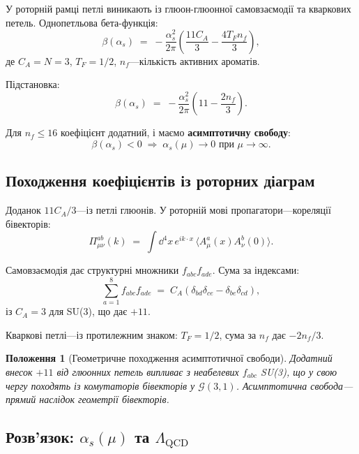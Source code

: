 \documentclass[11pt,a4paper]{article}
\newcommand{\Cl}{\mathcal{G}}
\theoremstyle{definition}
\theoremstyle{plain}
\newtheorem{proposition}{Положення}[section]
\theoremstyle{remark}
\begin{document}
У роторній рамці петлі виникають із глюон-глюонної самовзаємодії та кваркових петель. Однопетльова бета-функція:
\begin{equation}
\beta(\alpha_s) \;=\; -\frac{\alpha_s^2}{2\pi}\left(\frac{11C_A}{3} - \frac{4T_F n_f}{3}\right),
\label{eq:beta-function}
\end{equation}
де $C_A=N=3$, $T_F=1/2$, $n_f$—кількість активних ароматів.

Підстановка:
\begin{equation}
\beta(\alpha_s) \;=\; -\frac{\alpha_s^2}{2\pi}\left(11 - \frac{2n_f}{3}\right).
\label{eq:beta-qcd}
\end{equation}

Для $n_f\le 16$ коефіцієнт додатний, і маємо \textbf{асимптотичну свободу}:
\begin{equation}
\beta(\alpha_s)<0 \;\Rightarrow\; \alpha_s(\mu)\to 0 \text{ при } \mu\to\infty.
\end{equation}

\subsection{Походження коефіцієнтів із роторних діаграм}

Доданок $11C_A/3$—із петлі глюонів. У роторній мові пропагатори—кореляції бівекторів:
\begin{equation}
\Pi_{\mu\nu}^{ab}(k) \;=\; \int \dd^4x \, e^{ik \cdot x}\,\langle A_\mu^a(x) A_\nu^b(0) \rangle.
\end{equation}

Самовзаємодія дає структурні множники $f_{abc}f_{ade}$. Сума за індексами:
\begin{equation}
\sum_{a=1}^8 f_{abc}f_{ade} \;=\; C_A(\delta_{bd}\delta_{ce} - \delta_{be}\delta_{cd}),
\end{equation}
із $C_A=3$ для SU(3), що дає $+11$.

Кваркові петлі—із протилежним знаком: $T_F=1/2$, сума за $n_f$ дає $-2n_f/3$.

\begin{proposition}[Геометричне походження асимптотичної свободи]
Додатний внесок $+11$ від глюонних петель випливає з неабелевих $f_{abc}$ SU(3), що у свою чергу походять із комутаторів бівекторів у $\Cl(3,1)$. Асимптотична свобода—прямий наслідок геометрії бівекторів.
\end{proposition}

\subsection{Розв’язок: $\alpha_s(\mu)$ та $\Lambda_{\mathrm{QCD}}$}
\end{document}
